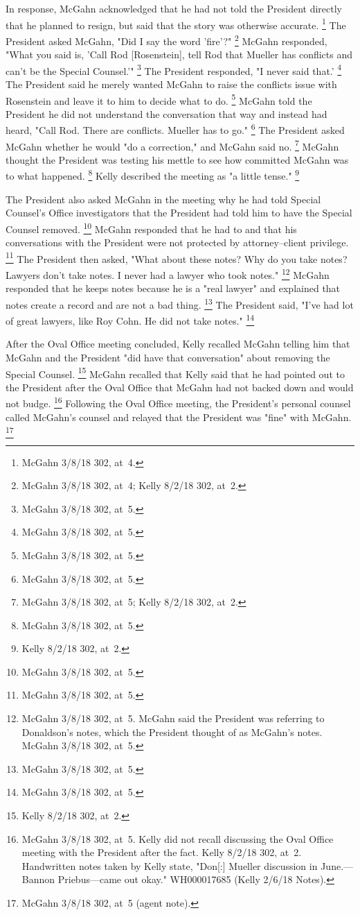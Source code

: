 In response, McGahn acknowledged that he had not told the President directly that he planned to resign, but said that the story was otherwise accurate.%
\footnote{McGahn 3/8/18 302, at~4.}
The President asked McGahn, "Did I say the word 'fire'?"%
\footnote{McGahn 3/8/18 302, at~4; Kelly 8/2/18 302, at~2.}
McGahn responded, "What you said is, 'Call Rod [Rosenstein], tell Rod that Mueller has conflicts and can't be the Special Counsel.'"%
\footnote{McGahn 3/8/18 302, at~5.}
The President responded, "I never said that.'%
\footnote{McGahn 3/8/18 302, at~5.}
The President said he merely wanted McGahn to raise the conflicts issue with Rosenstein and leave it to him to decide what to do.%
\footnote{McGahn 3/8/18 302, at~5.}
McGahn told the President he did not understand the conversation that way and instead had heard, "Call Rod.
There are conflicts.
Mueller has to go."%
\footnote{McGahn 3/8/18 302, at~5.}
The President asked McGahn whether he would "do a correction," and McGahn said no.%
\footnote{McGahn 3/8/18 302, at~5; Kelly 8/2/18 302, at~2.}
McGahn thought the President was testing his mettle to see how committed McGahn was to what happened.%
\footnote{McGahn 3/8/18 302, at~5.}
Kelly described the meeting as "a little tense."%
\footnote{Kelly 8/2/18 302, at~2.}

The President also asked McGahn in the meeting why he had told Special Counsel's Office investigators that the President had told him to have the Special Counsel removed.%
\footnote{McGahn 3/8/18 302, at~5.}
McGahn responded that he had to and that his conversations with the President were not protected by attorney--client privilege.%
\footnote{McGahn 3/8/18 302, at~5.}
The President then asked, "What about these notes? Why do you take notes? Lawyers don't take notes.
I never had a lawyer who took notes."%
\footnote{McGahn 3/8/18 302, at~5.
McGahn said the President was referring to Donaldson's notes, which the President thought of as McGahn's notes.
McGahn 3/8/18 302, at~5.}
McGahn responded that he keeps notes because he is a "real lawyer" and explained that notes create a record and are not a bad thing.%
\footnote{McGahn 3/8/18 302, at~5.}
The President said, "I've had lot of great lawyers, like Roy Cohn.
He did not take notes."%
\footnote{McGahn 3/8/18 302, at~5.}

After the Oval Office meeting concluded, Kelly recalled McGahn telling him that McGahn and the President "did have that conversation" about removing the Special Counsel.%
\footnote{Kelly 8/2/18 302, at~2.}
McGahn recalled that Kelly said that he had pointed out to the President after the Oval Office that McGahn had not backed down and would not budge.%
\footnote{McGahn 3/8/18 302, at~5.
Kelly did not recall discussing the Oval Office meeting with the President after the fact.
Kelly 8/2/18 302, at~2.
Handwritten notes taken by Kelly state, "Don[:] Mueller discussion in June.---Bannon Priebus---came out okay."
WH000017685 (Kelly 2/6/18 Notes).}
Following the Oval Office meeting, the President's personal counsel called McGahn's counsel and relayed that the President was "fine" with McGahn.%
\footnote{McGahn 3/8/18 302, at~5 (agent note).}

